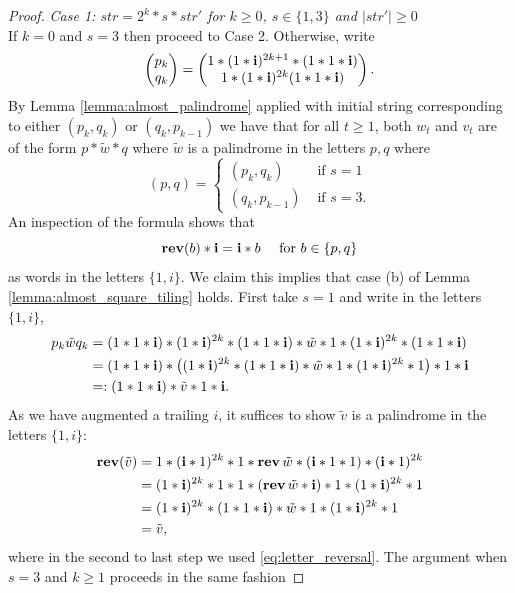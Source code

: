 \documentclass[12pt]{amsart}
\begin{document}
\begin{proof}
	
	
	
	
	{\it Case 1: $str = 2^k*s*str'$ for $k \geq 0$, $s \in \{1,3\}$ and $|str'| \geq 0$} \\
	If $k = 0$ and $s = 3$ then proceed to Case 2. Otherwise, write 
	\[
	\begin{pmatrix}
	p_k \\
	q_k 
	\end{pmatrix} 
	= 
	\begin{pmatrix} 1*( 1*\mathbf{i})^{2 k +1}*(1*1*\mathbf{i})  \\
	1*(1*\mathbf{i})^{2k} (1*1*\mathbf{i})
	\end{pmatrix}.
	\]
	By Lemma \ref{lemma:almost_palindrome} applied with initial string corresponding to either $(p_k,q_k)$ or $(q_k, p_{k-1})$
	we have that for all $t \geq 1$, both $w_t$ and $v_t$ are of the form $p*\tilde{w}*q$ where $\tilde{w}$ is a palindrome in the letters $p,q$
	where 
	\[
	(p,q) = \begin{cases} (p_k, q_k) &\mbox{ if $s = 1$} \\
	(q_k, p_{k-1}) &\mbox{ if $s = 3$}.
	\end{cases}
	\]
	An inspection of the formula shows that 
	\begin{equation}\label{eq:letter_reversal}
	\mathop{\bf rev}(b)*\mathbf{i} = \mathbf{i}*b \quad \mbox{ for $b \in \{p,q\}$}
	\end{equation}
	as words in the letters $\{1,i\}$. 
	We claim this implies that case (b) of Lemma \ref{lemma:almost_square_tiling} holds. First take $s = 1$ and write 
	in the letters $\{1,i\}$, 
	\begin{align*}
	p_k \tilde{w} q_k &=  (1*1*\mathbf{i})*(1*\mathbf{i})^{2k}*(1*1*\mathbf{i})*\tilde{w}*1*(1*\mathbf{i})^{2k}*(1*1*\mathbf{i}) \\
	&= (1*1*\mathbf{i})*\left( (1*\mathbf{i})^{2k}*(1*1*\mathbf{i})*\tilde{w}*1*(1*\mathbf{i})^{2k}*1\right)*1*\mathbf{i} \\
	&=: (1*1*\mathbf{i})*\tilde{v}*1*\mathbf{i}.
	\end{align*}
	As we have augmented a trailing $i$, it suffices to show $\tilde{v}$ is a palindrome in the letters $\{1,i\}$: 
	\begin{align*}
	\mathop{\bf rev}(\tilde{v}) &= 1*(\mathbf{i}*1)^{2k}*1*\mathop{\bf rev}{\tilde{w}}*(\mathbf{i}*1*1)*(\mathbf{i}*1)^{2k}  \\
	&= (1*\mathbf{i})^{2k}*1*1*(\mathop{\bf rev}{\tilde{w}}*\mathbf{i})*1*(1*\mathbf{i})^{2k}*1 \\
	&= (1*\mathbf{i})^{2k}*(1*1*\mathbf{i})*\tilde{w}*1*(1*\mathbf{i})^{2k}*1 \\
	&= \tilde{v},
	\end{align*}
	where in the second to last step we used \eqref{eq:letter_reversal}. The argument when $s = 3$ and $k \geq 1$ proceeds in the same fashion 

\end{proof}
\end{document}
